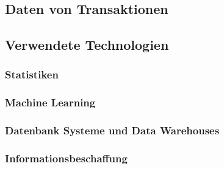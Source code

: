 \subsection{Daten von Transaktionen}

\subsection{Verwendete Technologien}

\subsubsection{Statistiken}

\subsubsection{Machine Learning}

\subsubsection{Datenbank Systeme und Data Warehouses}

\subsubsection{Informationsbeschaffung}
